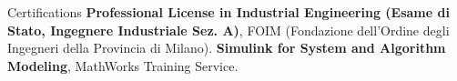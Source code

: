 \begin{rubric}{Certifications}
\entry*[02/22]%
	\textbf{Professional License in Industrial Engineering (Esame di Stato, Ingegnere Industriale Sez. A)}, FOIM (Fondazione dell'Ordine degli Ingegneri della Provincia di Milano).
%
%
\entry*[03/14]%
	\textbf{Simulink for System and Algorithm Modeling}, MathWorks Training Service.
%
\end{rubric}

